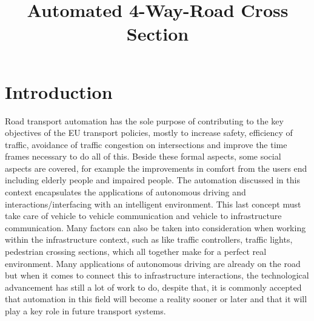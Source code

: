 \documentclass[conference]{IEEEtran}
\begin{document}
\title{Automated 4-Way-Road Cross Section}


\author{
\and
{}
\and
{}
\and
{}

}

\maketitle

\begin{abstract}

\end{abstract}

\section{Introduction}
Road transport automation has the sole purpose of contributing to the key objectives of the EU transport policies, mostly to increase safety, efficiency of traffic, avoidance of traffic congestion on intersections and improve the time frames necessary to do all of this. Beside these formal aspects, some social aspects are covered, for example the improvements in comfort from the users end including elderly people and impaired people.
The automation discussed in this context encapsulates the applications of autonomous driving and interactions/interfacing with an intelligent environment. This last concept must take care of vehicle to vehicle communication and vehicle to infrastructure communication. Many factors can also be taken into consideration when working within the infrastructure context, such as like traffic controllers, traffic lights, pedestrian crossing sections, which all together make for a perfect real environment. Many applications of autonomous driving are already on the road but when it comes to connect this to infrastructure interactions, the technological advancement has still a lot of work to do, despite that, it is commonly accepted that automation in this field will become a reality sooner or later and that it will play a key role in future transport systems. 
\end{document}
